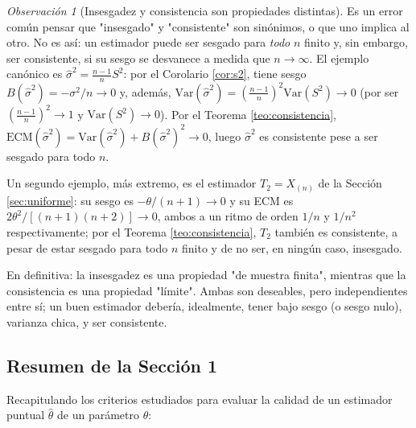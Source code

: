 \documentclass[11pt,a4paper]{article}
\theoremstyle{plain}
\theoremstyle{definition}
\theoremstyle{remark}
\newtheorem{observacion}[teorema]{Observación}
\begin{document}
\begin{observacion}[Insesgadez y consistencia son propiedades distintas]
Es un error común pensar que "insesgado" y "consistente" son sinónimos, o que uno implica al otro. No es así: un estimador puede ser sesgado para \emph{todo} $n$ finito y, sin embargo, ser consistente, si su sesgo se desvanece a medida que $n\to\infty$. El ejemplo canónico es $\widehat\sigma^2 = \frac{n-1}{n}S^2$: por el Corolario \ref{cor:s2}, tiene sesgo $B(\widehat\sigma^2)=-\sigma^2/n \to 0$ y, además, $\mathrm{Var}(\widehat\sigma^2) = \left(\frac{n-1}{n}\right)^2\mathrm{Var}(S^2)\to 0$ (por ser $\left(\frac{n-1}{n}\right)^2\to 1$ y $\mathrm{Var}(S^2)\to 0$). Por el Teorema \ref{teo:consistencia}, $\mathrm{ECM}(\widehat\sigma^2)=\mathrm{Var}(\widehat\sigma^2)+B(\widehat\sigma^2)^2\to 0$, luego $\widehat\sigma^2$ es consistente pese a ser sesgado para todo $n$.

Un segundo ejemplo, más extremo, es el estimador $T_2=X_{(n)}$ de la Sección \ref{sec:uniforme}: su sesgo es $-\theta/(n+1)\to 0$ y su ECM es $2\theta^2/[(n+1)(n+2)]\to 0$, ambos a un ritmo de orden $1/n$ y $1/n^2$ respectivamente; por el Teorema \ref{teo:consistencia}, $T_2$ también es consistente, a pesar de estar sesgado para todo $n$ finito y de no ser, en ningún caso, insesgado.

En definitiva: la insesgadez es una propiedad "de muestra finita", mientras que la consistencia es una propiedad "límite". Ambas son deseables, pero independientes entre sí; un buen estimador debería, idealmente, tener bajo sesgo (o sesgo nulo), varianza chica, y ser consistente.
\end{observacion}

\subsection{Resumen de la Sección 1}

Recapitulando los criterios estudiados para evaluar la calidad de un estimador puntual $\widehat\theta$ de un parámetro $\theta$:
\end{document}
